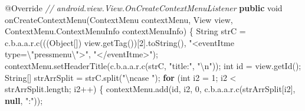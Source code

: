 \documentclass[
]{article}
\newenvironment{Shaded}{}{}
\newcommand{\AttributeTok}[1]{\textcolor[rgb]{0.49,0.56,0.16}{#1}}
\newcommand{\BuiltInTok}[1]{\textcolor[rgb]{0.00,0.50,0.00}{#1}}
\newcommand{\CommentTok}[1]{\textcolor[rgb]{0.38,0.63,0.69}{\textit{#1}}}
\newcommand{\ControlFlowTok}[1]{\textcolor[rgb]{0.00,0.44,0.13}{\textbf{#1}}}
\newcommand{\DataTypeTok}[1]{\textcolor[rgb]{0.56,0.13,0.00}{#1}}
\newcommand{\DecValTok}[1]{\textcolor[rgb]{0.25,0.63,0.44}{#1}}
\newcommand{\FunctionTok}[1]{\textcolor[rgb]{0.02,0.16,0.49}{#1}}
\newcommand{\KeywordTok}[1]{\textcolor[rgb]{0.00,0.44,0.13}{\textbf{#1}}}
\newcommand{\NormalTok}[1]{#1}
\newcommand{\OperatorTok}[1]{\textcolor[rgb]{0.40,0.40,0.40}{#1}}
\newcommand{\SpecialCharTok}[1]{\textcolor[rgb]{0.25,0.44,0.63}{#1}}
\newcommand{\StringTok}[1]{\textcolor[rgb]{0.25,0.44,0.63}{#1}}
\begin{document}
\begin{Shaded}
\begin{Highlighting}[]
        \AttributeTok{@Override} \CommentTok{// android.view.View.OnCreateContextMenuListener}
        \KeywordTok{public} \DataTypeTok{void} \FunctionTok{onCreateContextMenu}\OperatorTok{(}\NormalTok{ContextMenu contextMenu}\OperatorTok{,} \BuiltInTok{View}\NormalTok{ view}\OperatorTok{,}\NormalTok{ ContextMenu}\OperatorTok{.}\FunctionTok{ContextMenuInfo}\NormalTok{ contextMenuInfo}\OperatorTok{)} \OperatorTok{\{}
            \BuiltInTok{String}\NormalTok{ strC }\OperatorTok{=}\NormalTok{ c}\OperatorTok{.}\FunctionTok{b}\OperatorTok{.}\FunctionTok{a}\OperatorTok{.}\FunctionTok{a}\OperatorTok{.}\FunctionTok{r}\OperatorTok{.}\FunctionTok{c}\OperatorTok{(((}\BuiltInTok{Object}\OperatorTok{[])}\NormalTok{ view}\OperatorTok{.}\FunctionTok{getTag}\OperatorTok{())[}\DecValTok{2}\OperatorTok{].}\FunctionTok{toString}\OperatorTok{(),} \StringTok{"\textless{}eventItme type=}\SpecialCharTok{\textbackslash{}"}\StringTok{pressmenu}\SpecialCharTok{\textbackslash{}"}\StringTok{\textgreater{}"}\OperatorTok{,} \StringTok{"\textless{}/eventItme\textgreater{}"}\OperatorTok{);}
\NormalTok{            contextMenu}\OperatorTok{.}\FunctionTok{setHeaderTitle}\OperatorTok{(}\NormalTok{c}\OperatorTok{.}\FunctionTok{b}\OperatorTok{.}\FunctionTok{a}\OperatorTok{.}\FunctionTok{a}\OperatorTok{.}\FunctionTok{r}\OperatorTok{.}\FunctionTok{c}\OperatorTok{(}\NormalTok{strC}\OperatorTok{,} \StringTok{"title:"}\OperatorTok{,} \StringTok{"}\SpecialCharTok{\textbackslash{}n}\StringTok{"}\OperatorTok{));}
            \DataTypeTok{int}\NormalTok{ id }\OperatorTok{=}\NormalTok{ view}\OperatorTok{.}\FunctionTok{getId}\OperatorTok{();}
            \BuiltInTok{String}\OperatorTok{[]}\NormalTok{ strArrSplit }\OperatorTok{=}\NormalTok{ strC}\OperatorTok{.}\FunctionTok{split}\OperatorTok{(}\StringTok{"}\SpecialCharTok{\textbackslash{}n}\StringTok{case "}\OperatorTok{);}
            \ControlFlowTok{for} \OperatorTok{(}\DataTypeTok{int}\NormalTok{ i2 }\OperatorTok{=} \DecValTok{1}\OperatorTok{;}\NormalTok{ i2 }\OperatorTok{\textless{}}\NormalTok{ strArrSplit}\OperatorTok{.}\FunctionTok{length}\OperatorTok{;}\NormalTok{ i2}\OperatorTok{++)} \OperatorTok{\{}
\NormalTok{                contextMenu}\OperatorTok{.}\FunctionTok{add}\OperatorTok{(}\NormalTok{id}\OperatorTok{,}\NormalTok{ i2}\OperatorTok{,} \DecValTok{0}\OperatorTok{,}\NormalTok{ c}\OperatorTok{.}\FunctionTok{b}\OperatorTok{.}\FunctionTok{a}\OperatorTok{.}\FunctionTok{a}\OperatorTok{.}\FunctionTok{r}\OperatorTok{.}\FunctionTok{c}\OperatorTok{(}\NormalTok{strArrSplit}\OperatorTok{[}\NormalTok{i2}\OperatorTok{],} \KeywordTok{null}\OperatorTok{,} \StringTok{":"}\OperatorTok{));}

\end{Highlighting}
\end{Shaded}
\end{document}
